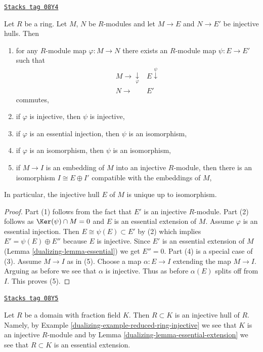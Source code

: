 \begin{lemma}
\label{dualizing-lemma-injective-hull-unique}
\href{https://stacks.math.columbia.edu/tag/08Y4}{\texttt{Stacks tag 08Y4}}

Let $R$ be a ring. Let $M$, $N$ be $R$-modules and let $M \to E$
and $N \to E'$ be injective hulls. Then
\begin{enumerate}
\item for any $R$-module map $\varphi : M \to N$ there exists an
$R$-module map $\psi : E \to E'$ such that
$$
\begin{array}{cc}M \longrightarrow\underset{\varphi}{\downarrow} & E \overset{\psi}{\downarrow} \\ N \longrightarrow & E'\end{array}
$$
commutes,
\item if $\varphi$ is injective, then $\psi$ is injective,
\item if $\varphi$ is an essential injection, then $\psi$ is an isomorphism,
\item if $\varphi$ is an isomorphism, then $\psi$ is an isomorphism,
\item if $M \to I$ is an embedding of $M$ into an injective $R$-module,
then there is an isomorphism $I \cong E \oplus I'$ compatible with
the embeddings of $M$,
\end{enumerate}
In particular, the injective hull $E$ of $M$ is unique up to isomorphism.
\end{lemma}

\begin{proof}

Part (1) follows from the fact that $E'$ is an injective $R$-module.
Part (2) follows as $\Ker(\psi) \cap M = 0$
and $E$ is an essential extension of $M$.
Assume $\varphi$ is an essential injection. Then
$E \cong \psi(E) \subset E'$ by (2) which implies
$E' = \psi(E) \oplus E''$ because $E$ is injective.
Since $E'$ is an essential extension of
$M$ (Lemma \ref{dualizing-lemma-essential}) we get $E'' = 0$.
Part (4) is a special case of (3).
Assume $M \to I$ as in (5).
Choose a map $\alpha : E \to I$ extending the map $M \to I$.
Arguing as before we see that $\alpha$ is injective.
Thus as before $\alpha(E)$ splits off from $I$.
This proves (5).
\end{proof}

\begin{example}
\label{dualizing-example-injective-hull-domain}
\href{https://stacks.math.columbia.edu/tag/08Y5}{\texttt{Stacks tag 08Y5}}

Let $R$ be a domain with fraction field $K$. Then $R \subset K$ is an
injective hull of $R$. Namely, by
Example \ref{dualizing-example-reduced-ring-injective} we see that $K$ is an injective
$R$-module and by Lemma \ref{dualizing-lemma-essential-extension} we see that
$R \subset K$ is an essential extension.
\end{example}

